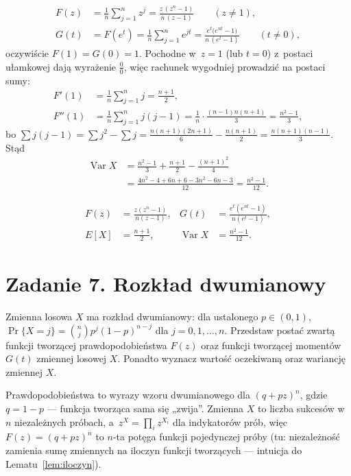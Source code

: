 \documentclass[11pt]{article}
\begin{document}
\formalnie
\begin{align*}
F(z)&=\frac1n\sum_{j=1}^nz^j=\frac{z\,(z^n-1)}{n\,(z-1)}\qquad(z\ne1),\\
G(t)&=F(e^t)=\frac1n\sum_{j=1}^ne^{jt}=\frac{e^t\bigl(e^{nt}-1\bigr)}{n\,(e^t-1)}\qquad(t\ne0),
\end{align*}
oczywiście $F(1)=G(0)=1$. Pochodne w~$z=1$ (lub $t=0$) z~postaci
ułamkowej dają wyrażenie $\frac00$, więc rachunek wygodniej prowadzić na
postaci sumy:
\begin{align*}
F'(1)&=\frac1n\sum_{j=1}^nj=\frac{n+1}{2},\\
F''(1)&=\frac1n\sum_{j=1}^nj(j-1)=\frac1n\cdot\frac{(n-1)n(n+1)}{3}=\frac{n^2-1}{3},
\end{align*}
bo $\sum j(j-1)=\sum j^2-\sum j=\frac{n(n+1)(2n+1)}6-\frac{n(n+1)}2
=\frac{n(n+1)(n-1)}3$. Stąd
\begin{align*}
\operatorname{Var}X&=\frac{n^2-1}{3}+\frac{n+1}2-\frac{(n+1)^2}4\\
&=\frac{4n^2-4+6n+6-3n^2-6n-3}{12}=\frac{n^2-1}{12}.
\end{align*}
\begin{odpowiedz}
\begin{align*}
F(z)&=\frac{z(z^n-1)}{n(z-1)},&
G(t)&=\frac{e^t(e^{nt}-1)}{n(e^t-1)},\\
E[X]&=\frac{n+1}2,&
\operatorname{Var}X&=\frac{n^2-1}{12}.
\end{align*}
\end{odpowiedz}

\section{Zadanie 7. Rozkład dwumianowy}
\begin{tresc}
Zmienna losowa $X$ ma rozkład dwumianowy: dla ustalonego $p\in(0,1)$,
$\Pr\{X=j\}=\binom njp^j(1-p)^{n-j}$ dla $j=0,1,\ldots,n$. Przedstaw postać
zwartą funkcji tworzącej prawdopodobieństwa $F(z)$ oraz funkcji tworzącej
momentów $G(t)$ zmiennej losowej $X$. Ponadto wyznacz wartość oczekiwaną
oraz wariancję zmiennej $X$.
\end{tresc}

\begin{intuicja}
Prawdopodobieństwa to wyrazy wzoru dwumianowego dla $(q+pz)^n$, gdzie
$q=1-p$ --- funkcja tworząca sama się „zwija”.
Zmienna $X$ to liczba sukcesów w~$n$ niezależnych próbach, a~$z^X=\prod_iz^{X_i}$ dla
indykatorów prób, więc $F(z)=(q+pz)^n$ to $n$-ta potęga funkcji pojedynczej
próby (tu: niezależność zamienia sumę zmiennych na iloczyn funkcji
tworzących --- intuicja do Lematu~\ref{lem:iloczyn}).
\end{intuicja}
\end{document}
